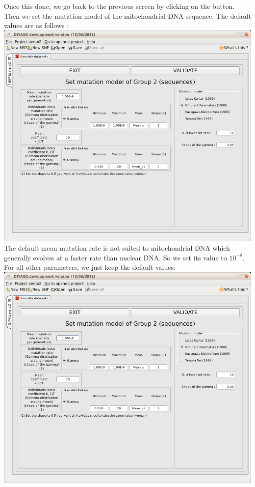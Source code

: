 Once this done, we go back to the previous screen by clicking on the  button. Then we set the mutation model of the mitochondrial DNA sequence. The default values are as follows :\\

\includegraphics[scale=0.33]{gui_pictures/Capture-DIYABC-82.png} \\

The default mean mutation rate is not suited to mitochondrial DNA which generally evolves at a faster rate than nuclear DNA. So we set its value to $10^{-8}$. For all other parameters, we just keep the default values:\\

\includegraphics[scale=0.33]{gui_pictures/Capture-DIYABC-83.png} \\

